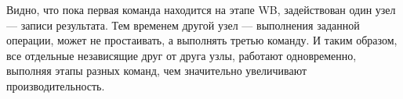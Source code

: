 Видно, что пока первая команда находится на этапе WB, задействован один узел --- записи результата.
Тем временем другой узел --- выполнения заданной операции, может не простаивать, а выполнять третью команду.
И таким образом, все отдельные независящие друг от друга узлы, работают одновременно, выполняя этапы разных команд, чем значительно увеличивают производительность.
